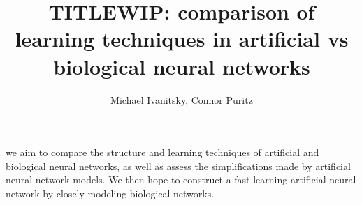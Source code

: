 \documentclass{article}
\date{}
\title{TITLE}
\author{Michael Ivanitsky, Connor Puritz}
\title{WIP: comparison of learning techniques in artificial vs biological neural networks}
\begin{document}
\maketitle

we aim to compare the structure and learning techniques of artificial and biological neural networks, as well as assess the simplifications made by artificial neural network models. We then hope to construct a fast-learning artificial neural network by closely modeling biological networks.
\end{document}
